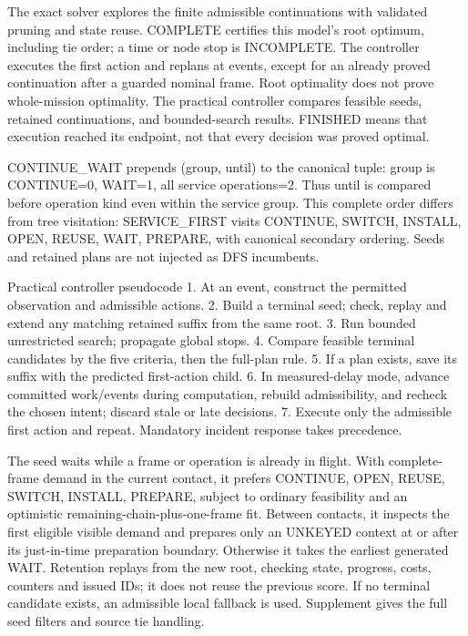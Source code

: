 \documentclass[12pt,a4paper]{article}
\begin{document}
The exact solver explores the finite admissible continuations with validated pruning and state reuse. COMPLETE certifies this model's root optimum, including tie order; a time or node stop is INCOMPLETE. The controller executes the first action and replans at events, except for an already proved continuation after a guarded nominal frame. Root optimality does not prove whole-mission optimality. The practical controller compares feasible seeds, retained continuations, and bounded-search results. FINISHED means that execution reached its endpoint, not that every decision was proved optimal.

CONTINUE\_WAIT prepends (group, until) to the canonical tuple: group is CONTINUE=0, WAIT=1, all service operations=2. Thus until is compared before operation kind even within the service group. This complete order differs from tree visitation: SERVICE\_FIRST visits CONTINUE, SWITCH, INSTALL, OPEN, REUSE, WAIT, PREPARE, with canonical secondary ordering. Seeds and retained plans are not injected as DFS incumbents.

Practical controller pseudocode\newline{}
1. At an event, construct the permitted observation and admissible actions.\newline{}
2. Build a terminal seed; check, replay and extend any matching retained suffix from the same root.\newline{}
3. Run bounded unrestricted search; propagate global stops.\newline{}
4. Compare feasible terminal candidates by the five criteria, then the full-plan rule.\newline{}
5. If a plan exists, save its suffix with the predicted first-action child.\newline{}
6. In measured-delay mode, advance committed work/events during computation, rebuild admissibility, and recheck the chosen intent; discard stale or late decisions.\newline{}
7. Execute only the admissible first action and repeat. Mandatory incident response takes precedence.

The seed waits while a frame or operation is already in flight. With complete-frame demand in the current contact, it prefers CONTINUE, OPEN, REUSE, SWITCH, INSTALL, PREPARE, subject to ordinary feasibility and an optimistic remaining-chain-plus-one-frame fit. Between contacts, it inspects the first eligible visible demand and prepares only an UNKEYED context at or after its just-in-time preparation boundary. Otherwise it takes the earliest generated WAIT. Retention replays from the new root, checking state, progress, costs, counters and issued IDs; it does not reuse the previous score. If no terminal candidate exists, an admissible local fallback is used. Supplement gives the full seed filters and source tie handling.
\end{document}
